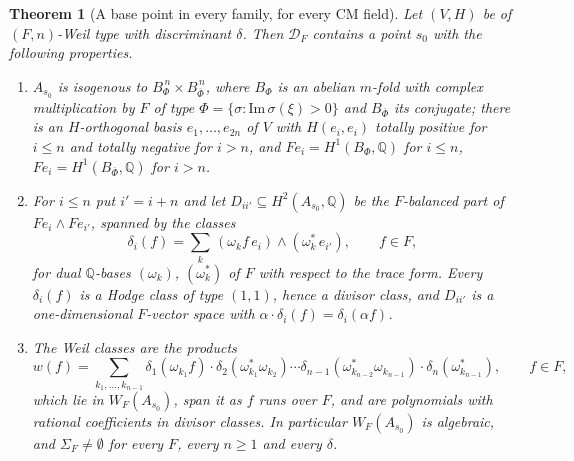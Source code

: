 \documentclass[11pt,reqno]{amsart}
\theoremstyle{plain}
\newtheorem{theorem}{Theorem}[section]
\theoremstyle{definition}
\theoremstyle{remark}
\newcommand{\QQ}{\mathbb{Q}}
\newcommand{\cD}{\mathcal{D}}
\newcommand{\bbar}[1]{\overline{#1}}
\begin{document}
\begin{theorem}[A base point in every family, for every CM field]
\label{thm:cmbasepoint}
Let $(V,H)$ be of $(F,n)$-Weil type with discriminant $\delta$. Then $\cD_{F}$
contains a point $s_{0}$ with the following properties.
\begin{enumerate}[label=\textup{(\roman*)},leftmargin=2.6em,itemsep=2pt]
\item $A_{s_{0}}$ is isogenous to $B_{\Phi}^{\,n}\times B_{\bbar\Phi}^{\,n}$,
  where $B_{\Phi}$ is an abelian $m$-fold with complex multiplication by $F$
  of type $\Phi=\{\sigma:\mathrm{Im}\,\sigma(\xi)>0\}$ and $B_{\bbar\Phi}$ its
  conjugate; there is an $H$-orthogonal basis $e_{1},\dots,e_{2n}$ of $V$
  with $H(e_{i},e_{i})$ totally positive for $i\le n$ and totally negative
  for $i>n$, and $Fe_{i}=H^{1}(B_{\Phi},\QQ)$ for $i\le n$,
  $Fe_{i}=H^{1}(B_{\bbar\Phi},\QQ)$ for $i>n$.
\item For $i\le n$ put $i'=i+n$ and let $D_{ii'}\subseteq H^{2}(A_{s_{0}},\QQ)$
  be the $F$-balanced part of $Fe_{i}\wedge Fe_{i'}$, spanned by the classes
  \[
    \delta_{i}(f)=\sum_{k}\,(\omega_{k}f\,e_{i})\wedge(\omega_{k}^{*}\,e_{i'}),
    \qquad f\in F,
  \]
  for dual $\QQ$-bases $(\omega_{k})$, $(\omega_{k}^{*})$ of $F$ with respect
  to the trace form. Every $\delta_{i}(f)$ is a Hodge class of type $(1,1)$,
  hence a divisor class, and $D_{ii'}$ is a one-dimensional $F$-vector space
  with $\alpha\cdot\delta_{i}(f)=\delta_{i}(\alpha f)$.
\item The Weil classes are the products
  \[
    w(f)=\sum_{k_{1},\dots,k_{n-1}}
      \delta_{1}(\omega_{k_{1}}f)\cdot\delta_{2}(\omega_{k_{1}}^{*}\omega_{k_{2}})
      \cdots\delta_{n-1}(\omega_{k_{n-2}}^{*}\omega_{k_{n-1}})\cdot
      \delta_{n}(\omega_{k_{n-1}}^{*}),\qquad f\in F,
  \]
  which lie in $W_{F}(A_{s_{0}})$, span it as $f$ runs over $F$, and are
  polynomials with rational coefficients in divisor classes. In particular
  $W_{F}(A_{s_{0}})$ is algebraic, and $\Sigma_{F}\ne\emptyset$ for every $F$,
  every $n\ge1$ and every $\delta$.
\end{enumerate}
\end{theorem}
\end{document}
